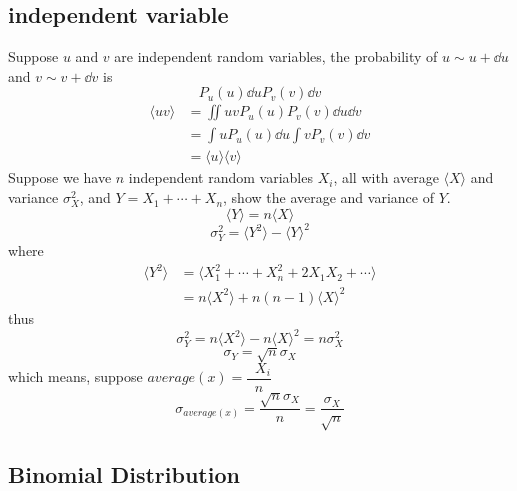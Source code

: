 \documentclass[UTF8]{ctexart} %
\DeclareMathOperator{\sumin}{\sum_{i=1}^n}
\numberwithin{equation}{subsection}
\begin{document}
\subsection{independent variable}
Suppose $u$ and $v$ are independent random variables, the probability of $u\sim u+\dd{u}$ and $v\sim v+\dd{v}$ is
\begin{equation}\label{key}
P_u(u)\dd{u}P_v(v)\dd{v}
\end{equation}
\begin{equation}\label{key}
\begin{aligned}
\langle uv\rangle&=\iint uv P_u(u)P_v(v)\dd{u}\dd{v}\\
&=\int u P_u(u)\dd{u}\int vP_v(v)\dd{v}\\
&=\langle u\rangle\langle v\rangle
\end{aligned}
\end{equation}
Suppose we have $n$ independent random variables $X_i$, all with average $\langle X\rangle$ and variance $\sigma_X^2$, and $Y=X_1+\cdots+X_n$, show the average and variance of $Y$.
\begin{equation}\label{key}
\langle Y\rangle=n\langle X\rangle
\end{equation}
\begin{equation}\label{key}
\sigma_Y^2=\langle Y^2\rangle-\langle Y\rangle^2
\end{equation}
where
\begin{equation}\label{key}
\begin{aligned}
\langle Y^2\rangle &=\langle X_1^2+\cdots+X_n^2+2X_1X_2+\cdots\rangle\\
&=n\langle X^2\rangle+n(n-1)\langle X\rangle^2
\end{aligned}
\end{equation}
thus
\begin{equation}\label{key}
\sigma_Y^2=n\langle X^2\rangle-n\langle X\rangle^2=n\sigma_X^2
\end{equation}
\begin{equation}\label{key}
\sigma_Y=\sqrt{n}\sigma_X
\end{equation}
which means, suppose $average(x)=\dfrac{\sumin X_i}{n}$
\begin{equation}\label{key}
\sigma_{average(x)}=\dfrac{\sqrt{n}\sigma_X}{n}=\dfrac{\sigma_X}{\sqrt{n}}
\end{equation}

\subsection{Binomial Distribution}
\end{document}
